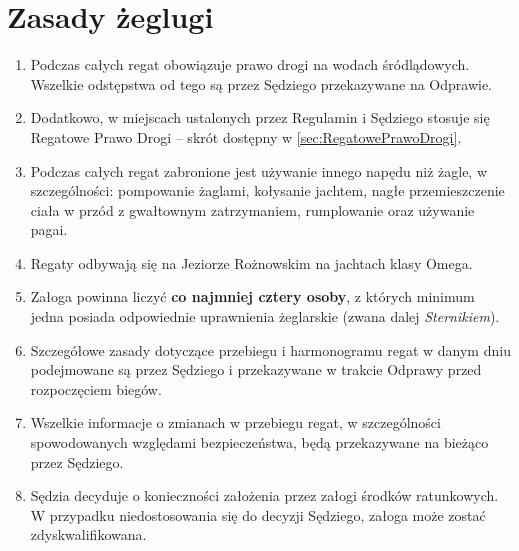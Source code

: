 \documentclass[12pt,a4paper]{article}
\begin{document}
\section{Zasady żeglugi}
\begin{enumerate}
    \item Podczas całych regat obowiązuje prawo drogi na wodach śródlądowych. Wszelkie odstępstwa od tego są przez Sędziego przekazywane na Odprawie.
    \item Dodatkowo, w miejscach ustalonych przez Regulamin i Sędziego stosuje się Regatowe Prawo Drogi -- skrót dostępny w \ref{sec:RegatowePrawoDrogi}.
    \item Podczas całych regat zabronione jest używanie innego napędu niż żagle, w szczególności: pompowanie żaglami, kołysanie jachtem, nagłe przemieszczenie ciała w przód z gwałtownym zatrzymaniem, rumplowanie oraz używanie pagai. 
    \item Regaty odbywają się na Jeziorze Rożnowskim na jachtach klasy Omega.
    \item Załoga powinna liczyć \textbf{co najmniej cztery osoby}, z których minimum jedna posiada odpowiednie uprawnienia żeglarskie (zwana dalej \textit{Sternikiem}).
    \item Szczegółowe zasady dotyczące przebiegu i harmonogramu regat w danym dniu podejmowane są przez Sędziego i przekazywane w trakcie Odprawy przed rozpoczęciem biegów.
    \item Wszelkie informacje o zmianach w przebiegu regat, w szczególności spowodowanych względami bezpieczeństwa, będą przekazywane na bieżąco przez Sędziego.
    \item Sędzia decyduje o konieczności założenia przez załogi środków ratunkowych. W przypadku niedostosowania się do decyzji Sędziego, załoga może zostać zdyskwalifikowana. 
\end{enumerate}
\end{document}

